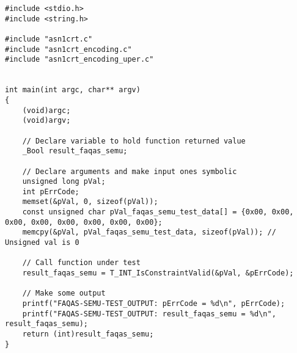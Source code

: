 
\begin{lstlisting}[style=CStyle,  caption=Generated test case, label=gen_test_case]
#include <stdio.h>
#include <string.h>

#include "asn1crt.c"
#include "asn1crt_encoding.c"
#include "asn1crt_encoding_uper.c"


int main(int argc, char** argv)
{
    (void)argc;
    (void)argv;

    // Declare variable to hold function returned value
    _Bool result_faqas_semu;

    // Declare arguments and make input ones symbolic
    unsigned long pVal;
    int pErrCode;
    memset(&pVal, 0, sizeof(pVal));
    const unsigned char pVal_faqas_semu_test_data[] = {0x00, 0x00, 0x00, 0x00, 0x00, 0x00, 0x00, 0x00};
    memcpy(&pVal, pVal_faqas_semu_test_data, sizeof(pVal)); // Unsigned val is 0

    // Call function under test
    result_faqas_semu = T_INT_IsConstraintValid(&pVal, &pErrCode);

    // Make some output
    printf("FAQAS-SEMU-TEST_OUTPUT: pErrCode = %d\n", pErrCode);
    printf("FAQAS-SEMU-TEST_OUTPUT: result_faqas_semu = %d\n", result_faqas_semu);
    return (int)result_faqas_semu;
}
\end{lstlisting}